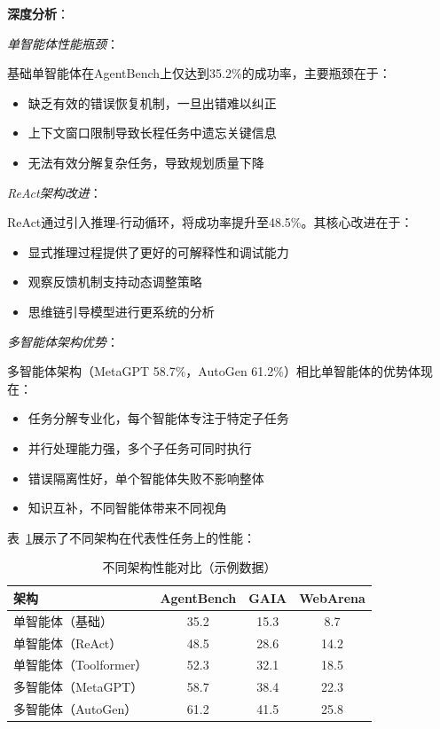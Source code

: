 \textbf{深度分析}：

\textit{单智能体性能瓶颈}：

基础单智能体在AgentBench上仅达到35.2\%的成功率，主要瓶颈在于：
\begin{itemize}[leftmargin=2em]
    \item 缺乏有效的错误恢复机制，一旦出错难以纠正
    \item 上下文窗口限制导致长程任务中遗忘关键信息
    \item 无法有效分解复杂任务，导致规划质量下降
\end{itemize}

\textit{ReAct架构改进}：

ReAct通过引入推理-行动循环，将成功率提升至48.5\%。其核心改进在于：
\begin{itemize}[leftmargin=2em]
    \item 显式推理过程提供了更好的可解释性和调试能力
    \item 观察反馈机制支持动态调整策略
    \item 思维链引导模型进行更系统的分析
\end{itemize}

\textit{多智能体架构优势}：

多智能体架构（MetaGPT 58.7\%，AutoGen 61.2\%）相比单智能体的优势体现在：
\begin{itemize}[leftmargin=2em]
    \item 任务分解专业化，每个智能体专注于特定子任务
    \item 并行处理能力强，多个子任务可同时执行
    \item 错误隔离性好，单个智能体失败不影响整体
    \item 知识互补，不同智能体带来不同视角
\end{itemize}

表~\ref{tab:architecture-performance}展示了不同架构在代表性任务上的性能：

\begin{table}[htbp]
    \centering
    \caption{不同架构性能对比（示例数据）}
    \label{tab:architecture-performance}
    \begin{tabular}{@{}lccc@{}}
        \toprule
        \textbf{架构} & \textbf{AgentBench} & \textbf{GAIA} & \textbf{WebArena} \\
        \midrule
        单智能体（基础） & 35.2 & 15.3 & 8.7 \\
        单智能体（ReAct） & 48.5 & 28.6 & 14.2 \\
        单智能体（Toolformer） & 52.3 & 32.1 & 18.5 \\
        多智能体（MetaGPT） & 58.7 & 38.4 & 22.3 \\
        多智能体（AutoGen） & 61.2 & 41.5 & 25.8 \\
        \bottomrule
    \end{tabular}
\end{table}

